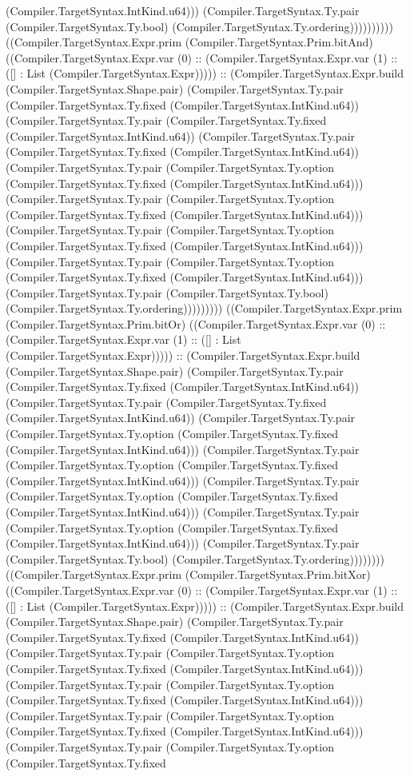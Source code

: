 \documentclass[11pt]{article}
\begin{document}
(Compiler.TargetSyntax.IntKind.u64))) (Compiler.TargetSyntax.Ty.pair (Compiler.TargetSyntax.Ty.bool) (Compiler.TargetSyntax.Ty.ordering)))))))))) ((Compiler.TargetSyntax.Expr.prim (Compiler.TargetSyntax.Prim.bitAnd) ((Compiler.TargetSyntax.Expr.var (0) :: (Compiler.TargetSyntax.Expr.var (1) :: ([] : List (Compiler.TargetSyntax.Expr))))) :: (Compiler.TargetSyntax.Expr.build (Compiler.TargetSyntax.Shape.pair) (Compiler.TargetSyntax.Ty.pair (Compiler.TargetSyntax.Ty.fixed (Compiler.TargetSyntax.IntKind.u64)) (Compiler.TargetSyntax.Ty.pair (Compiler.TargetSyntax.Ty.fixed (Compiler.TargetSyntax.IntKind.u64)) (Compiler.TargetSyntax.Ty.pair (Compiler.TargetSyntax.Ty.fixed (Compiler.TargetSyntax.IntKind.u64)) (Compiler.TargetSyntax.Ty.pair (Compiler.TargetSyntax.Ty.option (Compiler.TargetSyntax.Ty.fixed (Compiler.TargetSyntax.IntKind.u64))) (Compiler.TargetSyntax.Ty.pair (Compiler.TargetSyntax.Ty.option (Compiler.TargetSyntax.Ty.fixed (Compiler.TargetSyntax.IntKind.u64))) (Compiler.TargetSyntax.Ty.pair (Compiler.TargetSyntax.Ty.option (Compiler.TargetSyntax.Ty.fixed (Compiler.TargetSyntax.IntKind.u64))) (Compiler.TargetSyntax.Ty.pair (Compiler.TargetSyntax.Ty.option (Compiler.TargetSyntax.Ty.fixed (Compiler.TargetSyntax.IntKind.u64))) (Compiler.TargetSyntax.Ty.pair (Compiler.TargetSyntax.Ty.bool) (Compiler.TargetSyntax.Ty.ordering))))))))) ((Compiler.TargetSyntax.Expr.prim (Compiler.TargetSyntax.Prim.bitOr) ((Compiler.TargetSyntax.Expr.var (0) :: (Compiler.TargetSyntax.Expr.var (1) :: ([] : List (Compiler.TargetSyntax.Expr))))) :: (Compiler.TargetSyntax.Expr.build (Compiler.TargetSyntax.Shape.pair) (Compiler.TargetSyntax.Ty.pair (Compiler.TargetSyntax.Ty.fixed (Compiler.TargetSyntax.IntKind.u64)) (Compiler.TargetSyntax.Ty.pair (Compiler.TargetSyntax.Ty.fixed (Compiler.TargetSyntax.IntKind.u64)) (Compiler.TargetSyntax.Ty.pair (Compiler.TargetSyntax.Ty.option (Compiler.TargetSyntax.Ty.fixed (Compiler.TargetSyntax.IntKind.u64))) (Compiler.TargetSyntax.Ty.pair (Compiler.TargetSyntax.Ty.option (Compiler.TargetSyntax.Ty.fixed (Compiler.TargetSyntax.IntKind.u64))) (Compiler.TargetSyntax.Ty.pair (Compiler.TargetSyntax.Ty.option (Compiler.TargetSyntax.Ty.fixed (Compiler.TargetSyntax.IntKind.u64))) (Compiler.TargetSyntax.Ty.pair (Compiler.TargetSyntax.Ty.option (Compiler.TargetSyntax.Ty.fixed (Compiler.TargetSyntax.IntKind.u64))) (Compiler.TargetSyntax.Ty.pair (Compiler.TargetSyntax.Ty.bool) (Compiler.TargetSyntax.Ty.ordering)))))))) ((Compiler.TargetSyntax.Expr.prim (Compiler.TargetSyntax.Prim.bitXor) ((Compiler.TargetSyntax.Expr.var (0) :: (Compiler.TargetSyntax.Expr.var (1) :: ([] : List (Compiler.TargetSyntax.Expr))))) :: (Compiler.TargetSyntax.Expr.build (Compiler.TargetSyntax.Shape.pair) (Compiler.TargetSyntax.Ty.pair (Compiler.TargetSyntax.Ty.fixed (Compiler.TargetSyntax.IntKind.u64)) (Compiler.TargetSyntax.Ty.pair (Compiler.TargetSyntax.Ty.option (Compiler.TargetSyntax.Ty.fixed (Compiler.TargetSyntax.IntKind.u64))) (Compiler.TargetSyntax.Ty.pair (Compiler.TargetSyntax.Ty.option (Compiler.TargetSyntax.Ty.fixed (Compiler.TargetSyntax.IntKind.u64))) (Compiler.TargetSyntax.Ty.pair (Compiler.TargetSyntax.Ty.option (Compiler.TargetSyntax.Ty.fixed (Compiler.TargetSyntax.IntKind.u64))) (Compiler.TargetSyntax.Ty.pair (Compiler.TargetSyntax.Ty.option (Compiler.TargetSyntax.Ty.fixed 
\end{document}
